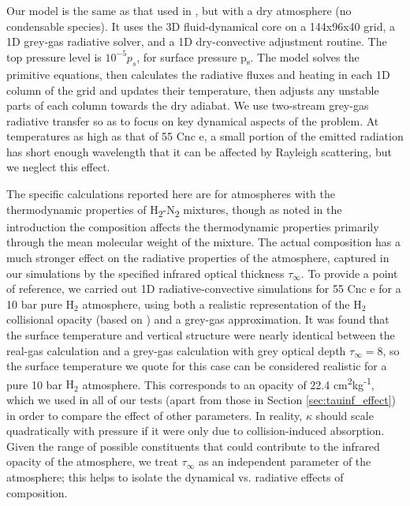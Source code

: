 Our model is the same as that used in \citet{pierrehumbert2016dynamics}, but with a dry atmosphere (no condensable species). It uses the 3D fluid-dynamical core on a 144x96x40 grid, a 1D grey-gas radiative solver, and a 1D dry-convective adjustment routine. The top pressure level is $10^{-5}p_{s}$, for surface pressure p\textsubscript{s}. The model solves the primitive equations, then calculates the radiative fluxes and heating in each 1D column of the grid and updates their temperature, then adjusts any unstable parts of each column towards the dry adiabat. We use two-stream grey-gas radiative transfer so as to focus on key dynamical aspects of the problem. At temperatures as high as that of 55 Cnc e, a small portion of the emitted radiation has short enough wavelength that it can be affected by Rayleigh scattering, but we neglect this effect.

The specific calculations reported here are for atmospheres with the thermodynamic properties of H\textsubscript{2}-N\textsubscript{2} mixtures, though as noted in the introduction the composition affects the thermodynamic properties primarily through the  mean molecular weight of the mixture.  The actual composition has a much stronger effect on the radiative properties of the atmosphere, captured in our simulations by the specified infrared optical thickness $\tau_{\infty}$. To provide a point of reference, we carried out 1D radiative-convective simulations for 55 Cnc e for a 10 bar pure $\mathrm{H_2}$ atmosphere, using both a realistic representation of the $\mathrm{H_2}$ collisional opacity (based on \citep{pierrehumbert2011hydrogen}) and a grey-gas approximation. It was found that the surface temperature and vertical structure were nearly identical between the real-gas calculation and a grey-gas calculation with grey optical depth $\tau_{\infty} = 8$, so the surface temperature we quote for this case can be considered realistic for a pure 10 bar $\mathrm{H_2}$ atmosphere. This corresponds to an opacity of  22.4 cm\textsuperscript{2}kg\textsuperscript{-1}, which we used in all of our tests (apart from those in Section \ref{sec:tauinf_effect}) in order to compare the effect of other parameters. In reality, $\kappa$ should scale quadratically with pressure if it were only due to collision-induced absorption. Given the range of possible constituents that could contribute to the infrared opacity of the atmosphere, we treat $\tau_{\infty}$ as an independent parameter of the atmosphere; this helps to isolate the dynamical vs. radiative effects of composition.

